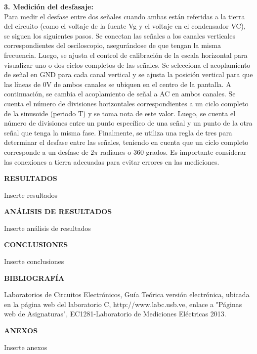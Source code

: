 \documentclass[12pt]{article}
\begin{document}
        \textbf{3. Medición del desfasaje:}\\
        
        Para medir el desfase entre dos señales cuando ambas están referidas a la tierra del circuito (como el voltaje de la fuente Vg y el voltaje en el condensador VC), se siguen los siguientes pasos. Se conectan las señales a los canales verticales correspondientes del osciloscopio, asegurándose de que tengan la misma frecuencia. Luego, se ajusta el control de calibración de la escala horizontal para visualizar uno o dos ciclos completos de las señales. Se selecciona el acoplamiento de señal en GND para cada canal vertical y se ajusta la posición vertical para que las líneas de 0V de ambos canales se ubiquen en el centro de la pantalla. A continuación, se cambia el acoplamiento de señal a AC en ambos canales. Se cuenta el número de divisiones horizontales correspondientes a un ciclo completo de la sinusoide (periodo T) y se toma nota de este valor. Luego, se cuenta el número de divisiones entre un punto específico de una señal y un punto de la otra señal que tenga la misma fase. Finalmente, se utiliza una regla de tres para determinar el desfase entre las señales, teniendo en cuenta que un ciclo completo corresponde a un desfase de $2\pi$ radianes o 360 grados. Es importante considerar las conexiones a tierra adecuadas para evitar errores en las mediciones.
	
	\newpage
	
	\begin{center}
		\textbf{\large RESULTADOS}\\
	\end{center}
	
	Inserte resultados
	
	\newpage
	
	\begin{center}
		\textbf{\large ANÁLISIS DE RESULTADOS}\\
	\end{center}
	
	Inserte análisis de resultados
	
	\newpage
	
	\begin{center}
		\textbf{\large CONCLUSIONES}\\
	\end{center}
	
	Inserte conclusiones
	
	\newpage
	
	\begin{center}
		\textbf{\large BIBLIOGRAFÍA}\\
	\end{center}
	
        \noindent Laboratorios de Circuitos Electrónicos, Guía Teórica versión electrónica, ubicada en la página web del laboratorio C, http://www.labc.usb.ve, enlace a "Páginas web de Asignaturas", EC1281-Laboratorio de Mediciones Eléctricas 2013.
	
	\newpage
	
	\begin{center}
		\textbf{\large ANEXOS}\\
	\end{center}
	
	Inserte anexos
	
\end{document}

